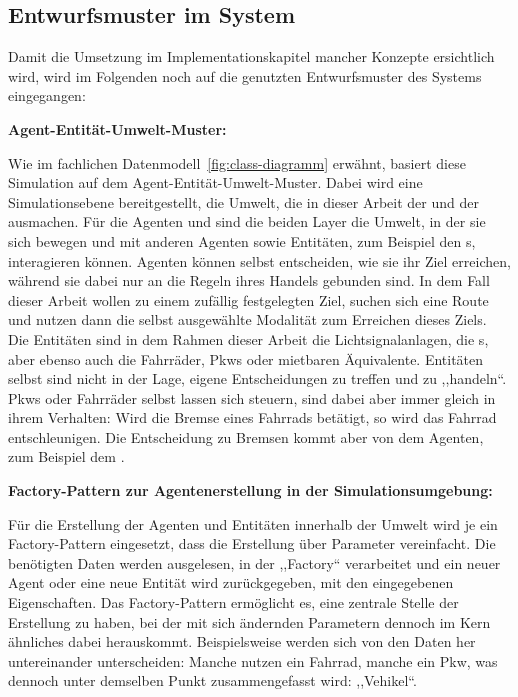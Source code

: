 %

\subsection{Entwurfsmuster im System}\label{subsec:design-pattern}

Damit die Umsetzung im Implementationskapitel mancher Konzepte ersichtlich wird, wird im Folgenden noch auf die genutzten Entwurfsmuster des Systems eingegangen:

\textbf{Agent-Entität-Umwelt-Muster:}

Wie im fachlichen Datenmodell~\ref{fig:class-diagramm} erwähnt, basiert diese Simulation auf dem Agent-Entität-Umwelt-Muster.
Dabei wird eine Simulationsebene bereitgestellt, die Umwelt, die in dieser Arbeit der  und der  ausmachen.
Für die Agenten  und  sind die beiden Layer die Umwelt, in der sie sich bewegen und mit anderen Agenten sowie Entitäten, zum Beispiel den s, interagieren können.
Agenten können selbst entscheiden, wie sie ihr Ziel erreichen, während sie dabei nur an die Regeln ihres Handels gebunden sind.
In dem Fall dieser Arbeit wollen  zu einem zufällig festgelegten Ziel, suchen sich eine Route und nutzen dann die selbst ausgewählte Modalität zum Erreichen dieses Ziels.
Die Entitäten sind in dem Rahmen dieser Arbeit die Lichtsignalanlagen, die s, aber ebenso auch die Fahrräder, Pkws oder mietbaren Äquivalente.
Entitäten selbst sind nicht in der Lage, eigene Entscheidungen zu treffen und zu ,,handeln``.
Pkws oder Fahrräder selbst lassen sich steuern, sind dabei aber immer gleich in ihrem Verhalten:
Wird die Bremse eines Fahrrads betätigt, so wird das Fahrrad entschleunigen.
Die Entscheidung zu Bremsen kommt aber von dem Agenten, zum Beispiel dem .

\textbf{Factory-Pattern zur Agentenerstellung in der Simulationsumgebung:}

Für die Erstellung der Agenten und Entitäten innerhalb der Umwelt wird je ein Factory-Pattern eingesetzt, dass die Erstellung über Parameter vereinfacht.
Die benötigten Daten werden ausgelesen, in der ,,Factory`` verarbeitet und ein neuer Agent oder eine neue Entität wird zurückgegeben, mit den eingegebenen Eigenschaften.
Das Factory-Pattern ermöglicht es, eine zentrale Stelle der Erstellung zu haben, bei der mit sich ändernden Parametern dennoch im Kern ähnliches dabei herauskommt.
Beispielsweise werden  sich von den Daten her untereinander unterscheiden: Manche nutzen ein Fahrrad, manche ein Pkw, was dennoch unter demselben Punkt zusammengefasst wird: ,,Vehikel``.

